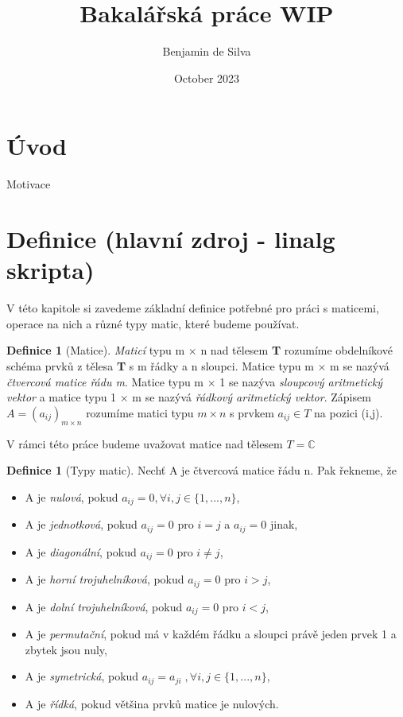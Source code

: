 \documentclass{article}
\title{Bakalářská práce WIP}
\author{Benjamin de Silva}
\date{October 2023}
\theoremstyle{plain}
\theoremstyle{definition}
\newtheorem{definice}[veta]{Definice}
\begin{document}
\maketitle
\newpage
\section*{Úvod}
Motivace
\newpage

\section{Definice (hlavní zdroj - linalg skripta)}
V této kapitole si zavedeme základní definice potřebné pro práci s maticemi, operace na nich a různé typy matic, které budeme používat.

\begin{definice}[Matice]

\emph{Maticí} typu m $\times$ n nad tělesem \textbf{T} rozumíme obdelníkové schéma prvků z tělesa \textbf{T} s m řádky a n sloupci. Matice typu m $\times$ m se nazývá \emph{čtvercová matice řádu m}. Matice typu m $\times$ 1 se nazýva \emph{sloupcový aritmetický vektor} a matice typu 1 $\times$ m se nazývá \emph{řádkový aritmetický vektor}. Zápisem $A=(a_{ij})_{m\times n}$ rozumíme matici typu $m\times n$ s prvkem $a_{ij}\in T$ na pozici (i,j).
\end{definice}
    V rámci této práce budeme uvažovat matice nad tělesem $T=\mathbb{C}$

\begin{definice}[Typy matic]
Nechť A je čtvercová matice řádu n. Pak řekneme, že
\begin{itemize}
    \item A je \emph{nulová}, pokud $a_{ij}=0, \forall i,j \in\{1,...,n\}$,
    \item A je \emph{jednotková}, pokud $a_{ij}=0$ pro $i=j$ a $a_{ij}=0$ jinak,
    \item A je \emph{diagonální}, pokud $a_{ij}=0$ pro $i\neq j$,
    \item A je \emph{horní trojuhelníková}, pokud $a_{ij}=0$ pro $i>j$,
    \item A je \emph{dolní trojuhelníková}, pokud $a_{ij}=0$ pro $i<j$,
    \item A je \emph{permutační}, pokud má v každém řádku a sloupci právě jeden prvek 1 a zbytek jsou nuly,
    \item A je \emph{symetrická}, pokud $a_{ij}=a_{ji}\;, \forall i,j \in\{1,...,n\}$,
    \item A je \emph{řídká}, pokud většina prvků matice je nulových.
\end{itemize}
\end{definice}
\end{document}
